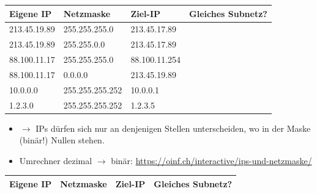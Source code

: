 \begin{myexercise}
	\begin{table}[H]
		\centering
		\begin{tabular}{l|l|l|m{2cm}}

			\textbf{Eigene \gls{IP}} & \textbf{Netzmaske} & \textbf{Ziel-\gls{IP}} & \textbf{Gleiches \newline Subnetz?} \\\midrule\midrule

			213.45.19.89             & 255.255.255.0      & 213.45.17.89           & \fldT                               \\\midrule

			213.45.19.89             & 255.255.0.0        & 213.45.17.89           & \fldT                               \\\midrule

			88.100.11.17             & 255.255.255.0      & 88.100.11.254          & \fldT                               \\\midrule

			88.100.11.17             & 0.0.0.0            & 213.45.19.89           & \fldT                               \\\midrule

			10.0.0.0                 & 255.255.255.252    & 10.0.0.1               & \fldT                               \\\midrule
			1.2.3.0                  & 255.255.255.252    & 1.2.3.5                & \fldT
		\end{tabular}
	\end{table}
	\begin{itemize}
		\item $\rightarrow$ \gls{IP}s dürfen sich nur an denjenigen Stellen unterscheiden, wo in der Maske (binär!) Nullen stehen.
		\item Umrechner dezimal $\rightarrow$ binär: \url{https://oinf.ch/interactive/ips-und-netzmaske/}
	\end{itemize}
	\begin{myanswer}

		\begin{table}[H]
			\centering
			\begin{tabular}{l|l|l|p{2cm}}

				\textbf{Eigene IP} & \textbf{Netzmaske} & \textbf{Ziel-IP}                 & \textbf{Gleiches \newline Subnetz?} \\\midrule\midrule


\end{tabular}
\end{table}
\end{myanswer}
\end{myexercise}
